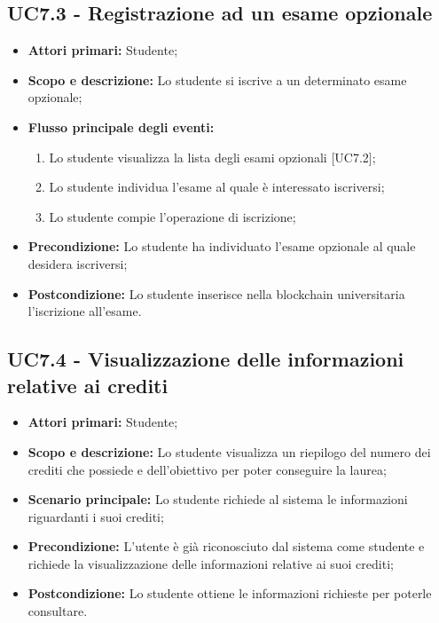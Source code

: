 \documentclass[AnalisiDeiRequisiti.tex]{subfiles}
\begin{document}
\subsection{UC7.3 - Registrazione ad un esame opzionale}
\begin{itemize}
	\item \textbf{Attori primari:} Studente;\\
	\item \textbf{Scopo e descrizione:} Lo studente si iscrive a un determinato esame opzionale;\\
	\item \textbf{Flusso principale degli eventi:}\\
	\begin{enumerate}
		\item Lo studente visualizza la lista degli esami opzionali [UC7.2];
		\item Lo studente individua l'esame al quale è interessato iscriversi;
		\item Lo studente compie l'operazione di iscrizione;
	\end{enumerate}
	\item \textbf{Precondizione:} Lo studente ha individuato l'esame opzionale al quale desidera iscriversi;\\
	\item \textbf{Postcondizione:} Lo studente inserisce nella blockchain universitaria l'iscrizione all'esame.\\
\end{itemize}

\subsection{UC7.4 - Visualizzazione delle informazioni relative ai crediti}
\begin{itemize}
	\item \textbf{Attori primari:} Studente;\\
	\item \textbf{Scopo e descrizione:} Lo studente visualizza un riepilogo del numero dei crediti che possiede e dell'obiettivo per poter conseguire la laurea;\\
	\item \textbf{Scenario principale:} Lo studente richiede al sistema le informazioni riguardanti i suoi crediti;\\
	\item \textbf{Precondizione:} L'utente è già riconosciuto dal sistema come studente e richiede la visualizzazione delle informazioni relative ai suoi crediti;\\
	\item \textbf{Postcondizione:} Lo studente ottiene le informazioni richieste per poterle consultare.\\
\end{itemize}
\end{document}
